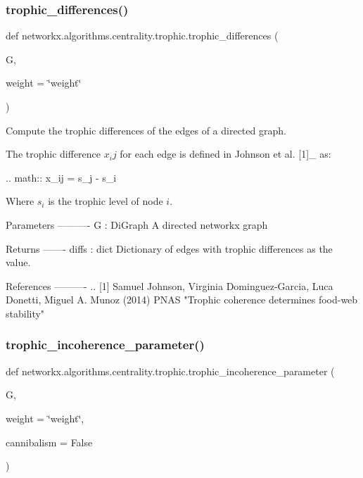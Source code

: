 \subsubsection{\texorpdfstring{trophic\+\_\+differences()}{trophic\_differences()}}
{\footnotesize\ttfamily def networkx.\+algorithms.\+centrality.\+trophic.\+trophic\+\_\+differences (\begin{DoxyParamCaption}\item[{}]{G,  }\item[{}]{weight = {\ttfamily \char`\"{}weight\char`\"{}} }\end{DoxyParamCaption})}

\begin{DoxyVerb}Compute the trophic differences of the edges of a directed graph.

The trophic difference $x_ij$ for each edge is defined in Johnson et al.
[1]_ as:

.. math::
    x_ij = s_j - s_i

Where $s_i$ is the trophic level of node $i$.

Parameters
----------
G : DiGraph
    A directed networkx graph

Returns
-------
diffs : dict
    Dictionary of edges with trophic differences as the value.

References
----------
.. [1] Samuel Johnson, Virginia Dominguez-Garcia, Luca Donetti, Miguel A.
    Munoz (2014) PNAS "Trophic coherence determines food-web stability"
\end{DoxyVerb}
 \mbox{\label{namespacenetworkx_1_1algorithms_1_1centrality_1_1trophic_a875b95b2b34a4b55cd69f423656bff23}} 
\subsubsection{\texorpdfstring{trophic\+\_\+incoherence\+\_\+parameter()}{trophic\_incoherence\_parameter()}}
{\footnotesize\ttfamily def networkx.\+algorithms.\+centrality.\+trophic.\+trophic\+\_\+incoherence\+\_\+parameter (\begin{DoxyParamCaption}\item[{}]{G,  }\item[{}]{weight = {\ttfamily \char`\"{}weight\char`\"{}},  }\item[{}]{cannibalism = {\ttfamily False} }\end{DoxyParamCaption})}

